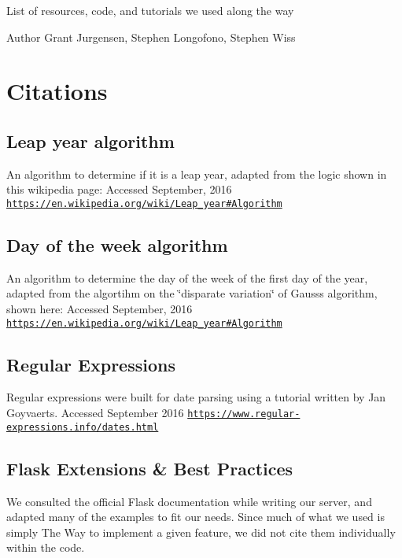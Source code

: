 List of resources, code, and tutorials we used along the way

\begin{DoxyAuthor}{Author}
Grant Jurgensen, Stephen Longofono, Stephen Wiss
\end{DoxyAuthor}
\hypertarget{Works_Citations}{}\section{Citations}\label{Works_Citations}
\hypertarget{Works_one}{}\subsection{Leap year algorithm}\label{Works_one}
An algorithm to determine if it is a leap year, adapted from the logic shown in this wikipedia page\+: Accessed September, 2016 \href{https://en.wikipedia.org/wiki/Leap_year#Algorithm}{\tt https\+://en.\+wikipedia.\+org/wiki/\+Leap\+\_\+year\#\+Algorithm}\hypertarget{Works_two}{}\subsection{Day of the week algorithm}\label{Works_two}
An algorithm to determine the day of the week of the first day of the year, adapted from the algortihm on the \char`\"{}disparate variation\char`\"{} of Gauss\textquotesingle{}s algorithm, shown here\+: Accessed September, 2016 \href{https://en.wikipedia.org/wiki/Leap_year#Algorithm}{\tt https\+://en.\+wikipedia.\+org/wiki/\+Leap\+\_\+year\#\+Algorithm}\hypertarget{Works_three}{}\subsection{Regular Expressions}\label{Works_three}
Regular expressions were built for date parsing using a tutorial written by Jan Goyvaerts. Accessed September 2016 \href{https://www.regular-expressions.info/dates.html}{\tt https\+://www.\+regular-\/expressions.\+info/dates.\+html}\hypertarget{Works_four}{}\subsection{Flask Extensions \& Best Practices}\label{Works_four}
We consulted the official Flask documentation while writing our server, and adapted many of the examples to fit our needs. Since much of what we used is simply The Way to implement a given feature, we did not cite them individually within the code.

